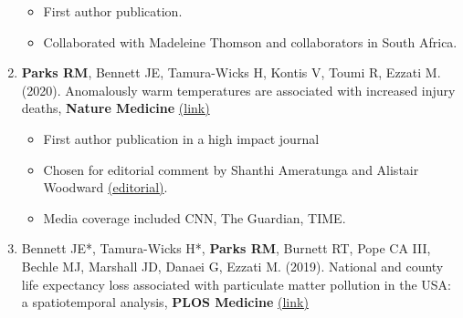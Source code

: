 \begin{enumerate}
    \begin{itemize}
        \item First author publication.
        \item Collaborated with Madeleine Thomson and collaborators in South Africa.
    \end{itemize}


     \item \textbf{Parks RM}, Bennett JE, Tamura-Wicks H, Kontis V, Toumi R, Ezzati M. (2020). Anomalously warm temperatures are associated with increased injury deaths, \textbf{Nature Medicine} \href{https://www.nature.com/articles/s41591-019-0721-y}{(link)} 

    \begin{itemize}
        \item First author publication in a high impact journal
        \item Chosen for editorial comment by Shanthi Ameratunga and Alistair Woodward  \href{https://www.nature.com/articles/s41591-019-0728-4}{(editorial)}.
        \item Media coverage included CNN, The Guardian, TIME.
    \end{itemize}

% 



\item Bennett JE*, Tamura-Wicks H*, \textbf{Parks RM}, Burnett RT, Pope CA III, Bechle MJ, Marshall JD, Danaei G, Ezzati M. (2019). National and county life expectancy loss associated with particulate matter pollution in the USA: a spatiotemporal analysis, \textbf{PLOS Medicine} \href{https://doi.org/10.1371/journal.pmed.1002856}{(link)} 


\end{enumerate}
